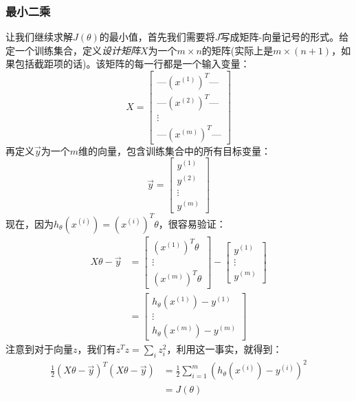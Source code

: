 \subsubsection{最小二乘}
让我们继续求解$J(\theta)$的最小值，首先我们需要将$J$写成矩阵-向量记号的形式。给定一个训练集合，定义\emph{设计矩阵}$X$为一个$m \times n$的矩阵(实际上是$m \times (n + 1)$，如果包括截距项的话)。该矩阵的每一行都是一个输入变量：
\begin{equation*}
X =
\begin{bmatrix}
\text{---} (x^{(1)})^T \text{---} \\
\text{---} (x^{(2)})^T \text{---} \\
\vdots \\
\text{---} (x^{(m)})^T \text{---}
\end{bmatrix}
\end{equation*}
再定义$\vec{y}$为一个$m$维的向量，包含训练集合中的所有目标变量：
\begin{equation*}
\vec{y} =
\begin{bmatrix}
y^{(1)} \\
y^{(2)} \\
\vdots \\
y^{(m)}
\end{bmatrix}
\end{equation*}
现在，因为$h_\theta(x^{(i)}) = (x^{(i)})^T\theta$，很容易验证：
\begin{equation*}
\begin{split}
X\theta - \vec{y} &=
\begin{bmatrix}
(x^{(1)})^T\theta \\
\vdots \\
(x^{(m)})^T\theta
\end{bmatrix}
-
\begin{bmatrix}
y^{(1)} \\
\vdots \\
y^{(m)}
\end{bmatrix} \\
&=
\begin{bmatrix}
h_\theta(x^{(1)}) - y^{(1)} \\
\vdots \\
h_\theta(x^{(m)}) - y^{(m)} 
\end{bmatrix}
\end{split}
\end{equation*}
注意到对于向量$z$，我们有$z^Tz = \sum_iz^2_i$，利用这一事实，就得到：
\begin{equation*}
\begin{split}
\frac{1}{2}(X\theta - \vec{y})^T(X\theta - \vec{y}) &= \frac{1}{2}\sum_{i = 1}^m(h_\theta(x^{(i)}) - y^{(i)})^2 \\
&= J(\theta)
\end{split}
\end{equation*}

